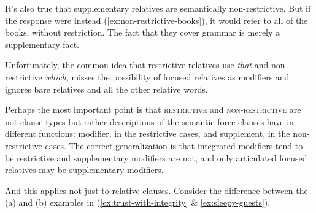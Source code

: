 \label{ex:restrictive-books}
\z

It's also true that supplementary relatives are semantically non-restrictive. But if the response were instead (\ref{ex:non-restrictive-books}), it would refer to all of the books, without restriction. The fact that they cover grammar is merely a supplementary fact. 

\label{ex:non-restrictive-books}
\z

Unfortunately, the common idea that restrictive relatives use \textit{that} and non-restrictive \textit{which}, misses the possibility of focused relatives as modifiers and ignores bare relatives and all the other relative words.

\ea
{}
\z
\z
\ea
{}
\z
\z

Perhaps the most important point is that \textsc{restrictive} and \textsc{non-restrictive} are not clause types but rather descriptions of the semantic force clauses have in different functions: modifier, in the restrictive cases, and supplement, in the non-restrictive cases. The correct generalization is that integrated modifiers tend to be restrictive and supplementary modifiers are not, and only articulated focused relatives may be supplementary modifiers.

And this applies not just to relative clauses. Consider the difference between the (a) and (b) examples in  (\ref{ex:trust-with-integrity} \& \ref{ex:sleepy-guests}).

\ea \label{ex:trust-with-integrity}
    \z
\z
\ea \label{ex:sleepy-guests}
    \z
\z

